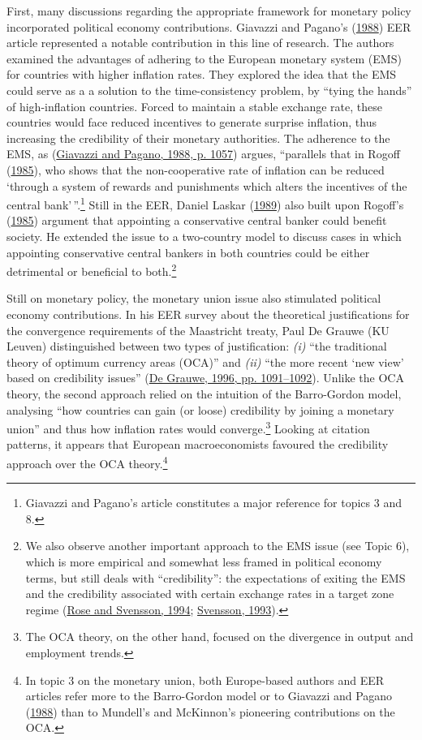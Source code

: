 \documentclass[
  12pt,
  onecolumn]{article}
\begin{document}
First, many discussions regarding the appropriate framework for monetary policy incorporated political economy contributions. Giavazzi and Pagano's (\protect\hyperlink{ref-giavazzi1988}{1988}) EER article represented a notable contribution in this line of research. The authors examined the advantages of adhering to the European monetary system (EMS) for countries with higher inflation rates. They explored the idea that the EMS could serve as a a solution to the time-consistency problem, by ``tying the hands'' of high-inflation countries. Forced to maintain a stable exchange rate, these countries would face reduced incentives to generate surprise inflation, thus increasing the credibility of their monetary authorities. The adherence to the EMS, as (\protect\hyperlink{ref-giavazzi1988}{Giavazzi and Pagano, 1988, p. 1057}) argues, ``parallels that in Rogoff (\protect\hyperlink{ref-rogoff1985b}{1985}), who shows that the non-cooperative rate of inflation can be reduced `through a system of rewards and punishments which alters the incentives of the central bank'\,''.\footnote{Giavazzi and Pagano's article constitutes a major reference for topics 3 and 8.} Still in the EER, Daniel Laskar (\protect\hyperlink{ref-laskar1989}{1989}) also built upon Rogoff's (\protect\hyperlink{ref-rogoff1985b}{1985}) argument that appointing a conservative central banker could benefit society. He extended the issue to a two-country model to discuss cases in which appointing conservative central bankers in both countries could be either detrimental or beneficial to both.\footnote{We also observe another important approach to the EMS issue (see Topic 6), which is more empirical and somewhat less framed in political economy terms, but still deals with ``credibility'': the expectations of exiting the EMS and the credibility associated with certain exchange rates in a target zone regime (\protect\hyperlink{ref-rose1994}{Rose and Svensson, 1994}; \protect\hyperlink{ref-svensson1993a}{Svensson, 1993}).}

Still on monetary policy, the monetary union issue also stimulated political economy contributions. In his EER survey about the theoretical justifications for the convergence requirements of the Maastricht treaty, Paul De Grauwe (KU Leuven) distinguished between two types of justification: \emph{(i)} ``the traditional theory of optimum currency areas (OCA)'' and \emph{(ii)} ``the more recent `new view' based on credibility issues'' (\protect\hyperlink{ref-degrauwe1996}{De Grauwe, 1996, pp. 1091--1092}). Unlike the OCA theory, the second approach relied on the intuition of the Barro-Gordon model, analysing ``how countries can gain (or loose) credibility by joining a monetary union'' and thus how inflation rates would converge.\footnote{The OCA theory, on the other hand, focused on the divergence in output and employment trends.} Looking at citation patterns, it appears that European macroeconomists favoured the credibility approach over the OCA theory.\footnote{In topic 3 on the monetary union, both Europe-based authors and EER articles refer more to the Barro-Gordon model or to Giavazzi and Pagano (\protect\hyperlink{ref-giavazzi1988}{1988}) than to Mundell's and McKinnon's pioneering contributions on the OCA.}
\end{document}

